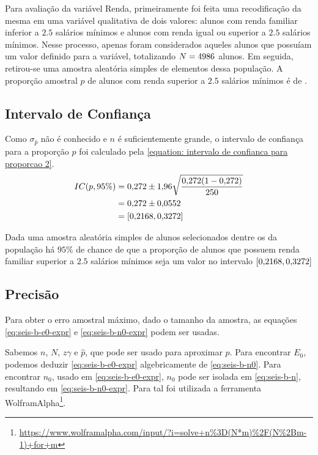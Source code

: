 

Para avaliação da variável Renda, primeiramente foi feita uma recodificação
da mesma em uma variável qualitativa de dois valores: alunos com renda
familiar inferior a $\num{2,5}$ salários mínimos e alunos com renda igual ou
superior a $\num{2,5}$ salários mínimos. Nesse processo, apenas foram considerados
aqueles alunos que possuíam um valor definido para a variável, totalizando
$N=4986$ alunos. Em seguida, retirou-se uma amostra aleatória simples de
\SEISn elementos dessa população. A proporção amostral $\hat{p}$ de alunos
com renda superior a $\num{2.5}$ salários mínimos é de \SEISpAmostral.

\subsection{Intervalo de Confiança}

	Como $\sigma_{\hat{p}}$ não é conhecido e $n$ é suficientemente grande,
	o intervalo de confiança para a proporção $p$ foi calculado pela
	\autoref{equation: intervalo de confianca para proporcao 2}.
	\begin{align*}
		IC(p, 95\%) &= \num{0.272} \pm \num{1.96} \sqrt{\frac{\num{0.272} (1- \num{0.272})}{250}} \nonumber \\
					&= \num{0.272} \pm \num{0.0552} \nonumber \\
					&= [\num{0.2168}, \num{0.3272}]
	\end{align*}

	\noindent Dada uma amostra aleatória simples de \SEISn alunos
	selecionados dentre os \SEISN da população há $95\%$ de chance de que a
	proporção de alunos que possuem renda familiar superior a $\num{2,5}$ salários
	mínimos seja um valor no intervalo $[\num{0.2168}, \num{0.3272}]$

\subsection{Precisão}

	Para obter o erro amostral máximo, dado o tamanho da amostra, as equações
	\eqref{eq:seis-b-e0-expr} e \eqref{eq:seis-b-n0-expr} podem ser usadas. 

	Sabemos $n$, $N$, $z\gamma$ e $\hat{p}$, que pode ser usado para aproximar
	$p$. Para encontrar $E_0$, podemos deduzir \eqref{eq:seis-b-e0-expr}
	algebricamente de \eqref{eq:seis-b-n0}. Para encontrar $n_0$, usado em
	\eqref{eq:seis-b-e0-expr}, $n_0$ pode ser isolada em
	\eqref{eq:seis-b-n}, resultando em \eqref{eq:seis-b-n0-expr}. Para tal
	foi utilizada a ferramenta
	WolframAlpha\footnote{\url{https://www.wolframalpha.com/input/?i=solve+n\%3D(N*m)\%2F(N\%2Bm-1)+for+m}}.

